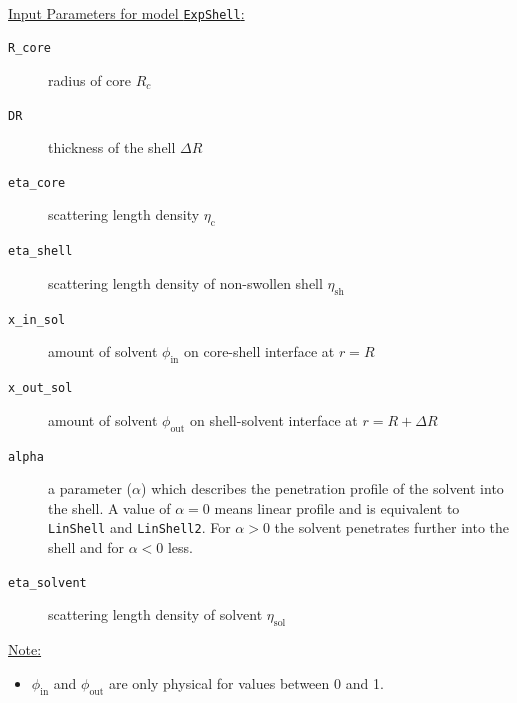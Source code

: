 \hspace{1pt}\\
\underline{Input Parameters for model \texttt{ExpShell}:}\\
\begin{description}
\item[\texttt{R\_core}] radius of core  $R_c$
\item[\texttt{DR}] thickness of the shell $\Delta R$
\item[\texttt{eta\_core}] scattering length density $\eta_\text{c}$
\item[\texttt{eta\_shell}] scattering length density of non-swollen shell $\eta_\text{sh}$
\item[\texttt{x\_in\_sol}] amount of solvent $\phi_\text{in}$ on core-shell interface at $r=R$
\item[\texttt{x\_out\_sol}] amount of solvent $\phi_\text{out}$ on shell-solvent interface at $r=R+\Delta R$
\item[\texttt{alpha}]  a parameter ($\alpha$) which describes the penetration profile of the solvent into the shell.
A value of $\alpha=0$ means linear profile and is equivalent to {\tt LinShell} and {\tt LinShell2}. For $\alpha>0$
the solvent penetrates further into the shell and for $\alpha<0$ less.
\item[\texttt{eta\_solvent}] scattering length density of solvent $\eta_\text{sol}$
\end{description}

\noindent\underline{Note:}
\begin{itemize}
\item $\phi_\text{in}$ and $\phi_\text{out}$ are only physical for values between 0 and 1.
\end{itemize}

